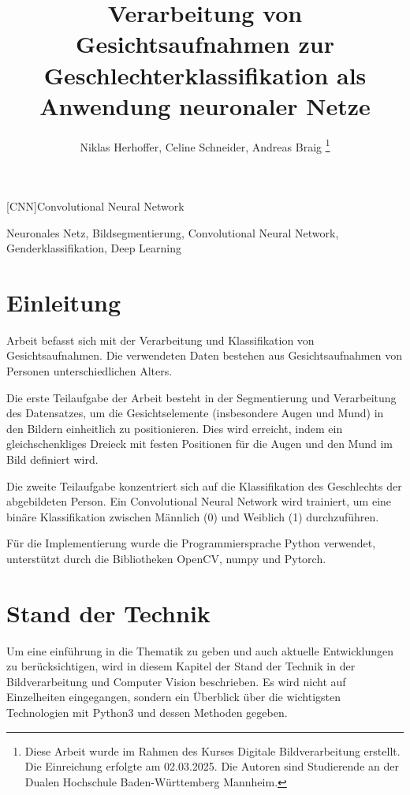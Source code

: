 \documentclass[journal,twoside,web]{ieeecolor}
\begin{document}
\begin{acronym}
    [CNN]{Convolutional Neural Network} 
\end{acronym}

\title{Verarbeitung von Gesichtsaufnahmen zur Geschlechterklassifikation als Anwendung neuronaler Netze}
\author{Niklas Herhoffer, Celine Schneider, Andreas Braig
\thanks{Diese Arbeit wurde im Rahmen des Kurses Digitale Bildverarbeitung erstellt. Die Einreichung erfolgte am 02.03.2025. Die Autoren sind Studierende an der Dualen Hochschule Baden-Württemberg Mannheim.}
}


\maketitle

    


\begin{IEEEkeywords}
    Neuronales Netz, Bildsegmentierung, Convolutional Neural Network, Genderklassifikation, Deep Learning
\end{IEEEkeywords}

\section{Einleitung}
\label{sec:introduction}
 Arbeit befasst sich mit der Verarbeitung und Klassifikation von Gesichtsaufnahmen. Die verwendeten Daten bestehen aus Gesichtsaufnahmen von Personen unterschiedlichen Alters. 

Die erste Teilaufgabe der Arbeit besteht in der Segmentierung und Verarbeitung des Datensatzes, um die Gesichtselemente (insbesondere Augen und Mund) in den Bildern einheitlich zu positionieren. Dies wird erreicht, indem ein gleichschenkliges Dreieck mit festen Positionen für die Augen und den Mund im Bild definiert wird. 

Die zweite Teilaufgabe konzentriert sich auf die Klassifikation des Geschlechts der abgebildeten Person. Ein Convolutional Neural Network wird trainiert, um eine binäre Klassifikation zwischen Männlich (0) und Weiblich (1) durchzuführen.

Für die Implementierung wurde die Programmiersprache Python verwendet, unterstützt durch die Bibliotheken OpenCV, numpy und Pytorch.

\section{Stand der Technik}
\label{sec:state_of_the_art}
Um eine einführung in die Thematik zu geben und auch aktuelle Entwicklungen zu berücksichtigen, wird in diesem Kapitel der Stand der Technik in der Bildverarbeitung und Computer Vision beschrieben. Es wird nicht auf Einzelheiten eingegangen, sondern ein Überblick über die wichtigsten Technologien mit Python3 und dessen Methoden gegeben.
\end{document}
